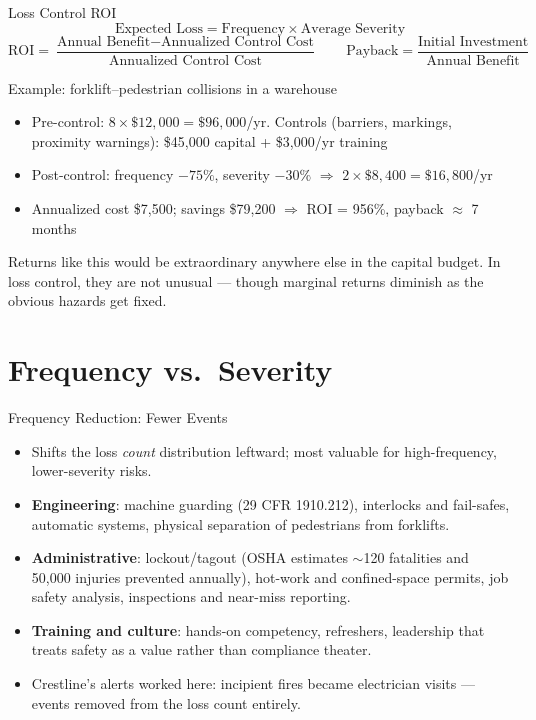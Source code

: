 \documentclass[11pt, aspectratio=169]{beamer}
\begin{document}
\begin{frame}{Loss Control ROI}
\[
\text{Expected Loss} = \text{Frequency} \times \text{Average Severity}
\]
\[
\text{ROI} = \frac{\text{Annual Benefit} - \text{Annualized Control Cost}}{\text{Annualized Control Cost}}
\qquad
\text{Payback} = \frac{\text{Initial Investment}}{\text{Annual Benefit}}
\]
\begin{exampleblock}{Example: forklift--pedestrian collisions in a warehouse}
\begin{itemize}
  \item Pre-control: $8 \times \$12{,}000 = \$96{,}000$/yr. Controls (barriers, markings, proximity warnings): \$45{,}000 capital + \$3{,}000/yr training
  \item Post-control: frequency $-75\%$, severity $-30\%$ $\Rightarrow$ $2 \times \$8{,}400 = \$16{,}800$/yr
  \item Annualized cost \$7{,}500; savings \$79{,}200 $\Rightarrow$ \alert{ROI = 956\%, payback $\approx$ 7 months}
\end{itemize}
\end{exampleblock}
\medskip
Returns like this would be extraordinary anywhere else in the capital budget. In loss control, they are not unusual --- though marginal returns diminish as the obvious hazards get fixed.
\end{frame}

\section{Frequency vs.\ Severity}

\begin{frame}{Frequency Reduction: Fewer Events}
\begin{itemize}
  \item Shifts the loss \emph{count} distribution leftward; most valuable for high-frequency, lower-severity risks.
  \item \textbf{Engineering}: machine guarding (29 CFR 1910.212), interlocks and fail-safes, automatic systems, physical separation of pedestrians from forklifts.
  \item \textbf{Administrative}: lockout/tagout (OSHA estimates $\sim$120 fatalities and 50{,}000 injuries prevented annually), hot-work and confined-space permits, job safety analysis, inspections and near-miss reporting.
  \item \textbf{Training and culture}: hands-on competency, refreshers, leadership that treats safety as a value rather than compliance theater.
  \item Crestline's alerts worked here: incipient fires became electrician visits --- events removed from the loss count entirely.
\end{itemize}
\end{frame}
\end{document}

